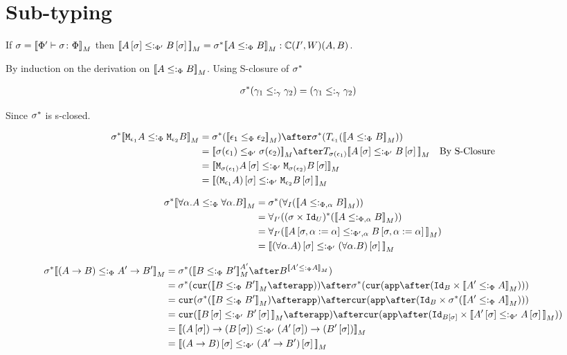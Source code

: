 \documentclass{report}
\begin{document}
\section{Sub-typing}
If $\sigma = {\bf [\![}\Phi' \vdash \sigma \colon \Phi{\bf ]\!]}_M$ then ${\bf [\![}A\left[\sigma\right]\leq:_{\Phi'} B\left[\sigma\right]{\bf ]\!]}_M = \sigma^*{\bf [\![}A\leq:_\Phi B{\bf ]\!]}_M: \mathbb{C}(I', W)(A, B)$.

\proof
By induction on the derivation on ${\bf [\![}A\leq:_\Phi B{\bf ]\!]}_M$. Using S-closure of $\sigma^*$ 

\begin{align}
    \sigma^*(\gamma_1\leq:_\gamma\gamma_2) &= (\gamma_1\leq:_\gamma\gamma_2)
\end{align}

Since $\sigma^*$ is s-closed.

\begin{align}
    \si\star\deno{\M{\e_1}{A} \subtypep \M{\e_2}{B}} & = \si\star(\deno{\e_1\subeffectp\e_2})\after\si\star(\T{\e_1}(\deno{A\subtypep B})) \\ 
     &= \deno{\si(\e_1)\subeffectpp\si(\e_2)} \after \T{\si(\e_1)}{\deno{A\ssi\subtypepp B\ssi}}\qt{By S-Closure}\\
     &= \deno{\M{\si(\e_1)}{A\ssi}\subtypepp\M{\si(\e_2)}{B\ssi}}\\
     &= \deno{(\M{\e_1}{A})\ssi\subtypepp\M{\e_2}{B}\ssi}\\
\end{align}

    \begin{align}
        \si\star\deno{\all{\a}{A}\subtypep\all{\a}{B}} &= \si\star(\allI(\deno{A\subtypepa B})) \\
        &=\allII((\si\times\Id{U})\star(\deno{A\subtypepa B}))\\
        &=\allII(\deno{A\sub{\si,\a\setto\a}\subtypeppa B\sub{\si,\a\setto\a}})\\
        &= \deno{(\all{\a}{A})\ssi \subtypepp(\all{\a}{B})\ssi}\\
    \end{align}

\begin{align}
    \si\star\deno{(\ab)\subtypep\fntype{A'}{B'}} &= \si\star(\deno{B\subtypep B'}^{A'}\after B^{\deno{A'\subtypep A}})\\
    &= \si\star(\cur{\deno{B\subtypep B'}\after\app})\after\si\star(\cur{\app\after(\Id{B}\times\deno{A'\subtypep A})})\\
    & = \cur{\si\star(\deno{B\subtypep B'})\after\app}\after\cur{\app\after(\Id{B}\times\si\star(\deno{A'\subtypep A}))}\\
    & = \cur{\deno{B\ssi\subtypepp B'\ssi}\after\app}\after\cur{\app\after(\Id{B\ssi}\times\deno{A'\ssi\subtypepp A\ssi})}\\
    &= \deno{\fntype{(A\ssi)}{(B\ssi)}\subtypepp\fntype{(A'\ssi)}{(B'\ssi)}}\\
    &= \deno{(\ab)\ssi\subtypepp(\fntype{A'}{B'})\ssi}
\end{align}
\end{document}
